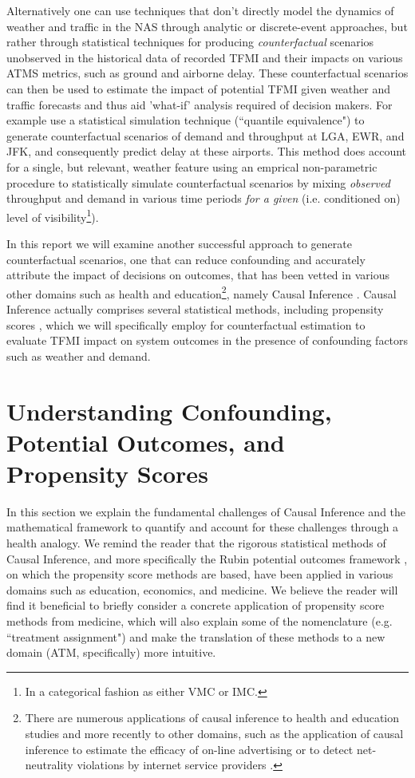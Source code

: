\documentclass[11pt]{scrartcl}
\begin{document}
Alternatively one can use techniques that don't directly model the dynamics of weather and traffic in the NAS through analytic or discrete-event approaches, but rather through statistical techniques for producing \emph{counterfactual} scenarios unobserved in the historical data of recorded TFMI and their impacts on various ATMS metrics, such as ground and airborne delay.  These counterfactual scenarios can then be used to estimate the impact of potential TFMI given weather and traffic forecasts and thus aid 'what-if' analysis required of decision makers.  For example\cite{kim2013} use a statistical simulation technique (``quantile equivalence") to generate counterfactual scenarios of demand and throughput at LGA, EWR, and JFK, and consequently predict delay at these airports.  This method does account for a single, but relevant, weather feature using an emprical non-parametric procedure to statistically simulate counterfactual scenarios by mixing \emph{observed} throughput and demand in various time periods \emph{for a given} (i.e. conditioned on) level of visibility\footnote{In a categorical fashion as either VMC or IMC.}).  

In this report we will examine another successful approach to generate counterfactual scenarios, one that can reduce confounding and accurately attribute the impact of decisions on outcomes, that has been vetted in various other domains such as health \cite{victora2004evidence} and education\footnote{There are numerous applications of causal inference to health and education studies and more recently to other domains, such as the application of causal inference to estimate the efficacy of on-line advertising \cite{bottou2013counterfactual} or to detect net-neutrality violations by internet service providers \cite{tariq2009detecting}.}, namely Causal Inference \cite{austin2011introduction}.  Causal Inference actually comprises several statistical methods, including propensity scores \cite{austin2011tutorial}, which we will specifically employ for counterfactual estimation to evaluate TFMI impact on system outcomes in the presence of confounding factors such as weather and demand.  

\section*{Understanding Confounding, Potential Outcomes, and Propensity Scores}
In this section we explain the fundamental challenges of Causal Inference and the mathematical framework to quantify and account for these challenges through a health analogy. We remind the reader that the rigorous statistical methods of Causal Inference, and more specifically the Rubin potential outcomes framework \cite{rubin1974estimating}, on which the propensity score methods are based, have been applied in various domains such as education, economics, and medicine.  We believe the reader will find it beneficial to briefly consider a concrete application of propensity score methods from medicine, which will also explain some of the nomenclature (e.g. ``treatment assignment") and make the translation of these methods to a new domain (ATM, specifically) more intuitive.  
\end{document}

